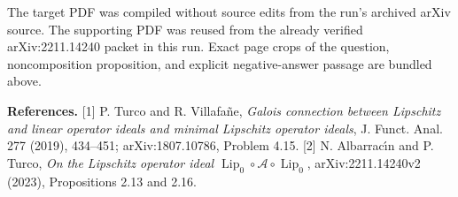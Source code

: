 \documentclass[11pt]{article}
\newcommand{\Lip}{\operatorname{Lip}_0}
\newcommand{\A}{\mathcal A}
\begin{document}
The target PDF was compiled without source edits from the run's archived
arXiv source.  The supporting PDF was reused from the already verified
arXiv:2211.14240 packet in this run.  Exact page crops of the question,
noncomposition proposition, and explicit negative-answer passage are bundled
above.

{\small
\textbf{References.}
[1] P. Turco and R. Villafa\~ne, \emph{Galois connection between Lipschitz
and linear operator ideals and minimal Lipschitz operator ideals}, J. Funct.
Anal. 277 (2019), 434--451; arXiv:1807.10786, Problem 4.15.
[2] N. Albarrac\'{\i}n and P. Turco, \emph{On the Lipschitz operator ideal
$\Lip\circ\A\circ\Lip$}, arXiv:2211.14240v2 (2023), Propositions
2.13 and 2.16.
}
\end{document}
